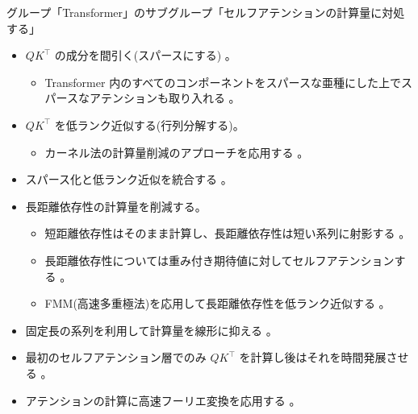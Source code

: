 \documentclass[b5paper,xelatex,ja=standard,10pt]{bxjsarticle}
\begin{document}
\vspace{1pt}
\begin{PROP2}[left=0pt]{グループ「Transformer」のサブグループ「セルフアテンションの計算量に対処する」}
\begin{itemize}
  \item $Q K ^\top$ の成分を間引く(スパースにする) 。
  \begin{itemize}
    \item Transformer 内のすべてのコンポーネントをスパースな亜種にした上でスパースなアテンションも取り入れる \cite{SebastianJaszczur2021}。
  \end{itemize}
  \vspace{6pt}
  \item $Q K ^\top$ を低ランク近似する(行列分解する)。
  \begin{itemize}
    \item カーネル法の計算量削減のアプローチを応用する \cite{YifanChen2021}。
  \end{itemize}
  \vspace{6pt}
  \item スパース化と低ランク近似を統合する \cite{BeidiChen2021}。
  \vspace{6pt}
  \item 長距離依存性の計算量を削減する。
  \begin{itemize}
    \item 短距離依存性はそのまま計算し、長距離依存性は短い系列に射影する \cite{ChenZhu2021}。
    \item 長距離依存性については重み付き期待値に対してセルフアテンションする \cite{HongyuRen2021}。
    \item FMM(高速多重極法)を応用して長距離依存性を低ランク近似する \cite{TanNguyen2021}。
  \end{itemize}
  \vspace{6pt}
  \item 固定長の系列を利用して計算量を線形に抑える \cite{XuezheMa2021}。
  \vspace{6pt}
  \item 最初のセルフアテンション層でのみ $Q K ^\top$ を計算し後はそれを時間発展させる \cite{SubhabrataDutta2021}。
  \vspace{6pt}
  \item アテンションの計算に高速フーリエ変換を応用する \cite{ShengjieLuo2021}。
\end{itemize}
\end{PROP2}
\vspace{1pt}
\end{document}
